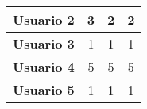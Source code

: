 \begin{table}[H]
{\begin{tabular}{c|ccc|}
            \multicolumn{1}{|c|}{\textbf{Usuario 2}} & \multicolumn{1}{c|}{3}                                                                                                                                                       & \multicolumn{1}{c|}{2}                                                                                                                                                                                & 2                                                                                                                                                                                                                    \\ \hline
            \multicolumn{1}{|c|}{\textbf{Usuario 3}} & \multicolumn{1}{c|}{1}                                                                                                                                                       & \multicolumn{1}{c|}{1}                                                                                                                                                                                & 1                                                                                                                                                                                                                    \\ \hline
            \multicolumn{1}{|c|}{\textbf{Usuario 4}} & \multicolumn{1}{c|}{5}                                                                                                                                                       & \multicolumn{1}{c|}{5}                                                                                                                                                                                & 5                                                                                                                                                                                                                    \\ \hline
            \multicolumn{1}{|c|}{\textbf{Usuario 5}} & \multicolumn{1}{c|}{1}                                                                                                                                                       & \multicolumn{1}{c|}{1}                                                                                                                                                                                & 1                                                                                                                                                                                                                    \\ \hline

\end{tabular}}
\end{table}
